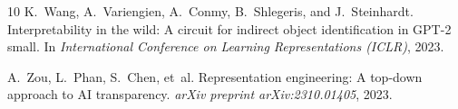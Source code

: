 \documentclass[11pt]{article}
\begin{document}
\begin{thebibliography}{10}
K.~Wang, A.~Variengien, A.~Conmy, B.~Shlegeris, and J.~Steinhardt.
\newblock Interpretability in the wild: A circuit for indirect object identification in GPT-2 small.
\newblock In \emph{International Conference on Learning Representations (ICLR)}, 2023.

A.~Zou, L.~Phan, S.~Chen, et~al.
\newblock Representation engineering: A top-down approach to AI transparency.
\newblock \emph{arXiv preprint arXiv:2310.01405}, 2023.

\end{thebibliography}
\end{document}
